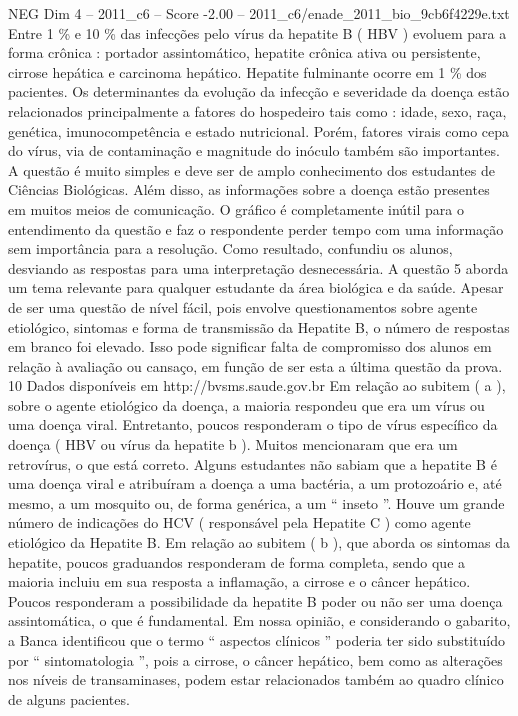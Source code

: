 \begin{textsample}{NEG Dim 4 – 2011\_c6 – Score -2.00 – 2011\_c6/enade\_2011\_bio\_9cb6f4229e.txt}
Entre 1 \% e 10 \% das infecções pelo vírus da hepatite B ( HBV ) evoluem para a forma crônica : portador assintomático, hepatite crônica ativa ou persistente, cirrose hepática e carcinoma hepático.
Hepatite fulminante ocorre em 1 \% dos pacientes.
Os determinantes da evolução da infecção e severidade da doença estão relacionados principalmente a fatores do hospedeiro tais como : idade, sexo, raça, genética, imunocompetência e estado nutricional.
Porém, fatores virais como cepa do vírus, via de contaminação e magnitude do inóculo também são importantes.
A questão é muito simples e deve ser de amplo conhecimento dos estudantes de Ciências Biológicas.
Além disso, as informações sobre a doença estão presentes em muitos meios de comunicação.
O gráfico é completamente inútil para o entendimento da questão e faz o respondente perder tempo com uma informação sem importância para a resolução.
Como resultado, confundiu os alunos, desviando as respostas para uma interpretação desnecessária.
A questão 5 aborda um tema relevante para qualquer estudante da área biológica e da saúde.
Apesar de ser uma questão de nível fácil, pois envolve questionamentos sobre agente etiológico, sintomas e forma de transmissão da Hepatite B, o número de respostas em branco foi elevado.
Isso pode significar falta de compromisso dos alunos em relação à avaliação ou cansaço, em função de ser esta a última questão da prova. 10 Dados disponíveis em http://bvsms.saude.gov.br Em relação ao subitem ( a ), sobre o agente etiológico da doença, a maioria respondeu que era um vírus ou uma doença viral.
Entretanto, poucos responderam o tipo de vírus específico da doença ( HBV ou vírus da hepatite b ).
Muitos mencionaram que era um retrovírus, o que está correto.
Alguns estudantes não sabiam que a hepatite B é uma doença viral e atribuíram a doença a uma bactéria, a um protozoário e, até mesmo, a um mosquito ou, de forma genérica, a um “ inseto ”.
Houve um grande número de indicações do HCV ( responsável pela Hepatite C ) como agente etiológico da Hepatite B.
Em relação ao subitem ( b ), que aborda os sintomas da hepatite, poucos graduandos responderam de forma completa, sendo que a maioria incluiu em sua resposta a inflamação, a cirrose e o câncer hepático.
Poucos responderam a possibilidade da hepatite B poder ou não ser uma doença assintomática, o que é fundamental.
Em nossa opinião, e considerando o gabarito, a Banca identificou que o termo “ aspectos clínicos ” poderia ter sido substituído por “ sintomatologia ”, pois a cirrose, o câncer hepático, bem como as alterações nos níveis de transaminases, podem estar relacionados também ao quadro clínico de alguns pacientes.

\end{textsample}
